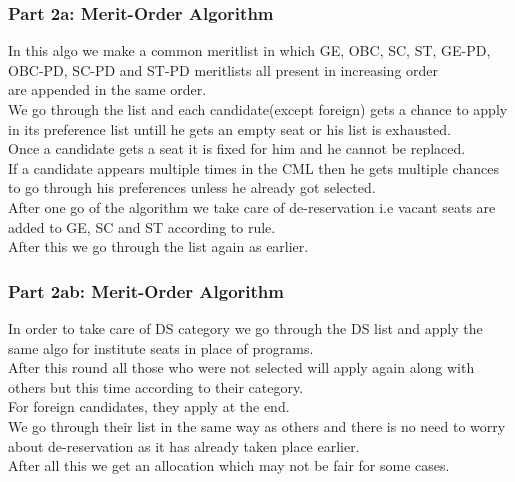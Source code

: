 \begin{frame}
	\frametitle{Part 2a: Merit-Order Algorithm}
	In this algo we make a common meritlist in which GE, OBC, SC, ST, GE-PD, OBC-PD, SC-PD and ST-PD meritlists all present in increasing order \\
	are appended in the same order. \pause \\
	We go through the list and each candidate(except foreign) gets a chance to apply in its preference list untill he gets an empty seat or his list is exhausted. \pause \\
	Once a candidate gets a seat it is fixed for him and he cannot be replaced. \pause \\
	If a candidate appears multiple times in the CML then he gets multiple chances to go through his preferences unless he already got selected. \pause \\
	After one go of the algorithm we take care of de-reservation i.e vacant seats are added to GE, SC and ST according to rule. \pause \\
	After this we go through the list again as earlier. \pause
\end{frame}

\begin{frame}
	\frametitle{Part 2ab: Merit-Order Algorithm}
	In order to take care of DS category we go through the DS list and apply the same algo for institute seats in place of programs. \pause \\
	After this round all those who were not selected will apply again along with others but this time according to their category. \pause \\
	For foreign candidates, they apply at the end. \pause \\
	We go through their list in the same way as others and there is no need to worry about de-reservation as it has already taken place earlier.\pause \\
	After all this we get an allocation which may not be fair for some cases. \pause
\end{frame}


